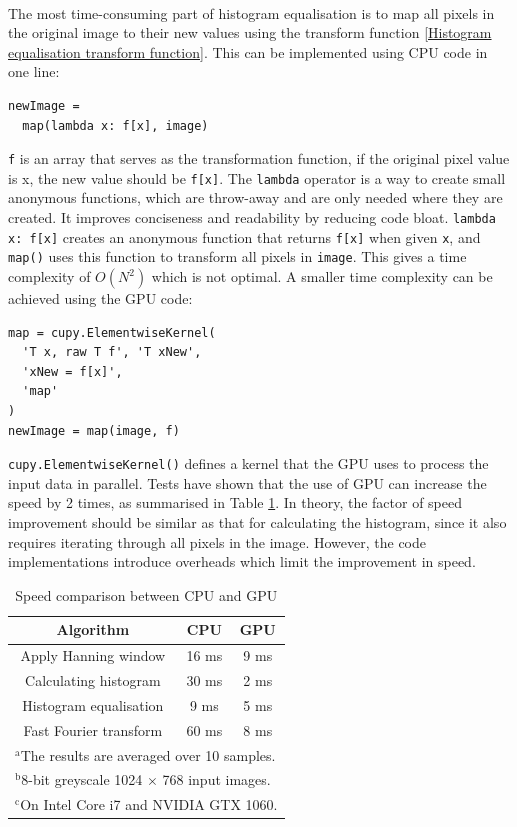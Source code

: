 \documentclass[12pt, twocolumn]{report}
\begin{document}
\paragraph{}
The most time-consuming part of histogram equalisation is to map all pixels in the original image to their new values using the transform function \eqref{Histogram equalisation transform function}. This can be implemented using CPU code in one line:
\begin{lstlisting}
newImage = 
  map(lambda x: f[x], image)
\end{lstlisting}
\lstinline{f} is an array that serves as the transformation function, if the original pixel value is x, the new value should be \lstinline{f[x]}. The \lstinline{lambda} operator is a way to create small anonymous functions, which are throw-away and are only needed where they are created. It improves conciseness and readability by reducing code bloat. \lstinline{lambda x: f[x]} creates an anonymous function that returns \lstinline{f[x]} when given \lstinline{x}, and \lstinline{map()} uses this function to transform all pixels in \lstinline{image}. This gives a time complexity of $O(N^2)$ which is not optimal. A smaller time complexity can be achieved using the GPU code:
\begin{lstlisting}
map = cupy.ElementwiseKernel(
  'T x, raw T f', 'T xNew',
  'xNew = f[x]',
  'map'
)
newImage = map(image, f)
\end{lstlisting}
\lstinline{cupy.ElementwiseKernel()} defines a kernel that the GPU uses to process the input data in parallel. Tests have shown that the use of GPU can increase the speed by 2 times, as summarised in Table \ref{Software speed comparison}. In theory, the factor of speed improvement should be similar as that for calculating the histogram, since it also requires iterating through all pixels in the image. However, the code implementations introduce overheads which limit the improvement in speed.

\begin{table}[htbp]
    \caption{Speed comparison between CPU and GPU}
    \begin{center}
    \begin{tabular}{|c|c|c|}
    \hline
    \textbf{Algorithm} & \textbf{CPU} & \textbf{GPU} \\
    \hline
    Apply Hanning window & 16 ms & 9 ms \\
    \hline
    Calculating histogram & 30 ms & 2 ms \\
    \hline
    Histogram equalisation & 9 ms & 5 ms \\
    \hline
    Fast Fourier transform & 60 ms & 8 ms \\
    \hline
    \multicolumn{3}{l}{$^{\mathrm{a}}$The results are averaged over 10 samples.} \\
    \multicolumn{3}{l}{$^{\mathrm{b}}$8-bit greyscale 1024 $\times$ 768 input images.} \\
    \multicolumn{3}{l}{$^{\mathrm{c}}$On Intel Core i7 and NVIDIA GTX 1060.}
    \end{tabular}
    \label{Software speed comparison}
    \end{center}
\end{table}
\end{document}
